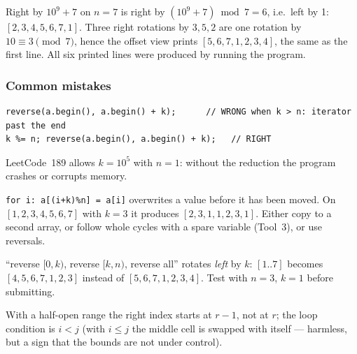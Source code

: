 \begin{insightbox}
Right by $10^9+7$ on $n = 7$ is right by $(10^9+7) \bmod 7 = 6$, i.e.\ left by 1: $[2,3,4,5,6,7,1]$. Three right rotations by $3, 5, 2$ are one rotation by $10 \equiv 3 \pmod 7$, hence the offset view prints $[5,6,7,1,2,3,4]$, the same as the first line. All six printed lines were produced by running the program.
\end{insightbox}

\subsubsection*{Common mistakes}

\begin{warningbox}
\begin{lstlisting}[style=snippet]
reverse(a.begin(), a.begin() + k);      // WRONG when k > n: iterator past the end
k %= n; reverse(a.begin(), a.begin() + k);   // RIGHT
\end{lstlisting}
LeetCode~189 allows $k = 10^5$ with $n = 1$: without the reduction the program crashes or corrupts memory.
\end{warningbox}

\begin{warningbox}
\texttt{for i: a[(i+k)\%n] = a[i]} overwrites a value before it has been moved. On $[1,2,3,4,5,6,7]$ with $k=3$ it produces $[2,3,1,1,2,3,1]$. Either copy to a second array, or follow whole cycles with a spare variable (Tool~3), or use reversals.
\end{warningbox}

\begin{warningbox}
``reverse $[0,k)$, reverse $[k,n)$, reverse all'' rotates \emph{left} by $k$: $[1..7]$ becomes $[4,5,6,7,1,2,3]$ instead of $[5,6,7,1,2,3,4]$. Test with $n = 3$, $k = 1$ before submitting.
\end{warningbox}

\begin{warningbox}
With a half-open range the right index starts at $r-1$, not at $r$; the loop condition is $i < j$ (with $i \le j$ the middle cell is swapped with itself --- harmless, but a sign that the bounds are not under control).
\end{warningbox}

